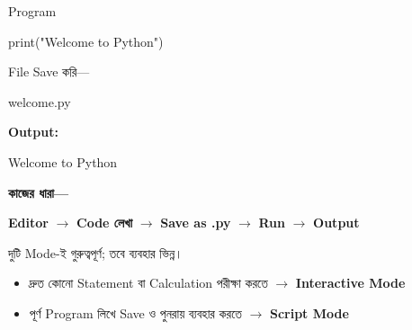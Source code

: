 \begin{examplebox}{Program}

\begin{codebox}

\begin{english}
\ttfamily
print("Welcome to Python")
\end{english}

\end{codebox}

File Save করি—

\begin{codebox}

\begin{english}
\ttfamily
welcome.py
\end{english}

\end{codebox}

\textbf{Output:}

\begin{codebox}

\begin{english}
\ttfamily
Welcome to Python
\end{english}

\end{codebox}

\end{examplebox}

\textbf{কাজের ধারা—}

\begin{center}

\textbf{Editor}
\(\longrightarrow\)
\textbf{Code লেখা}
\(\longrightarrow\)
\textbf{Save as \textenglish{\ttfamily .py}}
\(\longrightarrow\)
\textbf{Run}
\(\longrightarrow\)
\textbf{Output}

\end{center}



দুটি Mode-ই গুরুত্বপূর্ণ; তবে ব্যবহার ভিন্ন।

\begin{itemize}

\item
দ্রুত কোনো Statement বা Calculation পরীক্ষা করতে
\(\longrightarrow\)
\textbf{Interactive Mode}

\item
পূর্ণ Program লিখে Save ও পুনরায় ব্যবহার করতে
\(\longrightarrow\)
\textbf{Script Mode}

\end{itemize}


